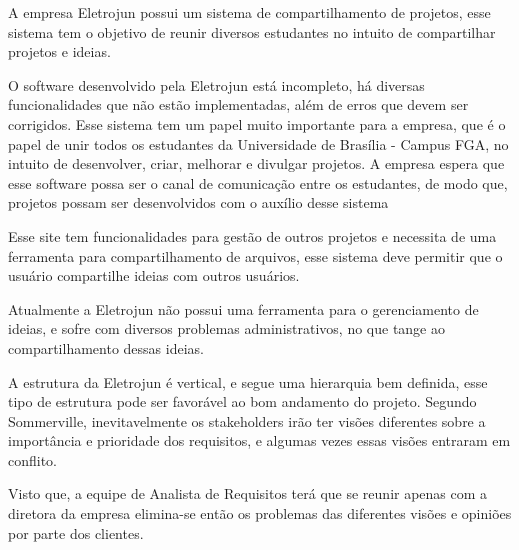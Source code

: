 A empresa Eletrojun possui um sistema de compartilhamento de projetos, esse sistema tem o objetivo de reunir diversos estudantes no intuito de compartilhar projetos e ideias.

O software desenvolvido pela Eletrojun está incompleto, há diversas funcionalidades que não estão implementadas, além de erros que devem ser corrigidos. Esse sistema tem um papel muito importante para a empresa, que é o papel de unir todos os estudantes da Universidade de Brasília - Campus FGA, no intuito de desenvolver, criar, melhorar e divulgar projetos. A empresa espera que esse software possa ser o canal de comunicação entre os estudantes, de modo que, projetos possam ser desenvolvidos com o auxílio desse sistema

Esse site tem funcionalidades para gestão de outros projetos e necessita de uma ferramenta para compartilhamento de arquivos, esse sistema deve permitir que o usuário compartilhe ideias com outros usuários.

Atualmente a Eletrojun não possui uma ferramenta para o gerenciamento de ideias, e sofre com diversos problemas administrativos, no que tange ao
compartilhamento dessas ideias.

A estrutura da Eletrojun é vertical, e segue uma hierarquia bem definida, esse tipo de estrutura pode ser favorável ao bom andamento do projeto. Segundo Sommerville, inevitavelmente os stakeholders irão ter visões diferentes sobre a importância e prioridade dos requisitos, e algumas vezes essas visões entraram em conflito.

Visto que, a equipe de Analista de Requisitos terá que se reunir apenas com a diretora da empresa elimina-se então os problemas das diferentes visões e opiniões por parte dos clientes.

